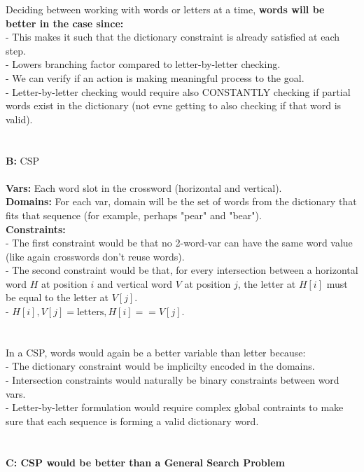 \documentclass[11pt]{article}
\begin{document}
    \noindent Deciding between working with words or letters at a time, \textbf{words will be better in the case since:}\\
    - This makes it such that the dictionary constraint is already satisfied at each step.\\
    - Lowers branching factor compared to letter-by-letter checking.\\
    - We can verify if an action is making meaningful process to the goal.\\
    - Letter-by-letter checking would require also CONSTANTLY checking if partial words exist in the dictionary (not evne getting to also checking if that word is valid).\\
    \\
    \\
    \textbf{B: } CSP\\
    \\
    \textbf{Vars: } Each word slot in the crossword (horizontal and vertical). \\
    \textbf{Domains: } For each var, domain will be the set of words from the dictionary that fits that sequence (for example, perhaps "pear" and "bear").\\
    \textbf{Constraints: }\\
    - The first constraint would be that no 2-word-var can have the same word value (like again crosswords don't reuse words). \\
    - The second constraint would be that, for every intersection between a horizontal word $H$ at position $i$ and vertical word $V$ at position $j$, the letter at $H[i]$ must be equal to the letter at $V[j]$.\\
    \indent - $H[i], V[j] = \text{letters}, H[i] == V[j]$.\\
    \\
    \\
    In a CSP, words would again be a better variable than letter because: \\
    - The dictionary constraint would be implicilty encoded in the domains. \\
    - Intersection constraints would naturally be binary constraints between word vars. \\
    - Letter-by-letter formulation would require complex global contraints to make sure that each sequence is forming a valid dictionary word. \\
    \\
    \\
    \textbf{C: CSP would be better than a General Search Problem} \\
\end{document}
